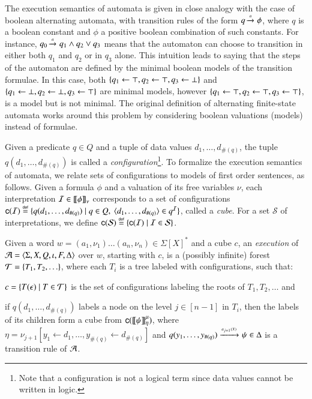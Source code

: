 The execution semantics of automata is given in close analogy with the
case of boolean alternating automata, with transition rules of the
form $q \xrightarrow{{\scriptscriptstyle a}}_{{\scriptstyle }} \phi$, where $q$ is a boolean constant and $\phi$
a positive boolean combination of such constants. For instance, $q_0
\xrightarrow{{\scriptscriptstyle a}}_{{\scriptstyle }} q_1 \wedge q_2 \vee q_3$ means that the automaton can
choose to transition in either both $q_1$ and $q_2$ or in $q_3$
alone. This intuition leads to saying that the steps of the automaton
are defined by the minimal boolean models of the transition
formulae. In this case, both $\{ q_1 \leftarrow \top, q_2 \leftarrow
  \top, q_3 \leftarrow \bot \}$ and $\{ q_1 \leftarrow \bot, q_2
  \leftarrow \bot, q_3 \leftarrow \top \}$ are minimal models, however
$\{ q_1 \leftarrow \top, q_2 \leftarrow \top, q_3 \leftarrow \top \}$,
is a model but is not minimal. The original definition of alternating
finite-state automata \cite{ChandraKozenStockmeyer81} works around
this problem by considering boolean valuations (models) instead of
formulae.

Given a predicate $q \in Q$ and a tuple of data values
$d_1,\ldots,d_{\#(q)}$, the tuple $q(d_1,\ldots,d_{\#(q)})$ is called
a \emph{configuration}\footnote{Note that a configuration is not a
  logical term since data values cannot be written in logic.}. To
formalize the execution semantics of automata, we relate sets of
configurations to models of first order sentences, as follows. Given a
formula $\phi$ and a valuation of its free variables $\nu$, each
interpretation $\mathcal{I} \in {\bf [\![} \phi {\bf ]\!]}_\nu$ corresponds to a set of
configurations $\mathsf{c}({\mathcal{I}}) \stackrel{\scriptscriptstyle{\mathsf{def}}}{=} \{ q(d_1,\ldots,d_{\#(q)}) \mid q
  \in Q,~ \langle d_1,\ldots,d_{\#(q)} \rangle \in q^{\mathcal{I}} \}$, called a
\emph{cube}. For a set $\mathcal{S}$ of interpretations, we define
$\mathsf{c}({\mathcal{S}}) \stackrel{\scriptscriptstyle{\mathsf{def}}}{=} \{ \mathsf{c}({\mathcal{I}}) \mid \mathcal{I} \in
  \mathcal{S} \}$. 

\begin{definition}\label{def:execution}
Given a word $w=(a_1,\nu_1) \ldots (a_n,\nu_n) \in \Sigma[X]^*$ and a cube $c$, an
\emph{execution} of $\mathcal{A}=\langle \Sigma,X,Q,\iota,F,\Delta \rangle$ over $w$, starting with $c$, is
a (possibly infinite) forest $\mathcal{T} = \{ T_1,T_2,\ldots \}$, where each
$T_i$ is a tree labeled with configurations, such that:
\begin{compactenum}
\item\label{it1:execution} $c = \{ T(\epsilon) \mid T \in \mathcal{T} \}$ is the set of
  configurations labeling the roots of $T_1,T_2,\ldots$ and
%
\item\label{it2:execution} if $q(d_1,\ldots,d_{\#(q)})$ labels a node on the level $j \in
  [n-1]$ in $T_i$, then the labels of its children form a cube from
  $\mathsf{c}({{\bf [\![} \psi {\bf ]\!]}^\mu_{\eta}})$, where $\eta = \nu_{j+1}[y_1
    \leftarrow d_1,\ldots,y_{\#(q)} \leftarrow d_{\#(q)}]$ and
  \(q(y_1,\ldots,y_{\#(q)}) \xrightarrow{{\scriptscriptstyle a_{j+1}(X)}}_{{\scriptstyle }} \psi \in \Delta\) is
  a transition rule of $\mathcal{A}$.
\end{compactenum}
\end{definition}

